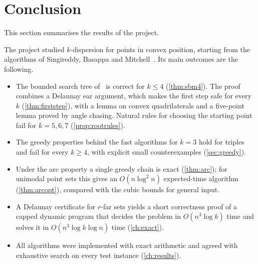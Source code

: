 \chapter{Conclusion}\label{ch:conclusion}

\begin{chapterabstract}
This section summarises the results of the project.
\end{chapterabstract}

The project studied $k$-dispersion for points in convex position, starting
from the algorithms of Singireddy, Basappa and Mitchell~\citep{sbm}. Its main
outcomes are the following.

\begin{itemize}[leftmargin=*,itemsep=2pt]
\item The bounded search tree of~\citet{sbm} is correct for $k\le4$
(\cref{thm:sbm4}). The proof combines a Delaunay ear argument, which makes the
first step safe for every $k$ (\cref{thm:firststep}), with a lemma on convex
quadrilaterals and a five-point lemma proved by angle chasing. Natural rules
for choosing the starting point fail for $k=5,6,7$ (\cref{prop:rootrules}).
\item The greedy properties behind the fast algorithms for $k=3$ hold for
triples and fail for every $k\ge4$, with explicit small counterexamples
(\cref{sec:greedy}).
\item Under the arc property a single greedy chain is exact
(\cref{thm:arc}); for unimodal point sets this gives an
$O(n\log^2n)$ expected-time algorithm (\cref{thm:arcopt}), compared with the
cubic bounds for general input.
\item A Delaunay certificate for $r$-far sets yields a short correctness proof of
a capped dynamic program that decides the problem in $O(n^3\log k)$ time and
solves it in $O(n^3\log k\log n)$ time (\cref{ch:exact}).
\item All algorithms were implemented with exact arithmetic and agreed with
exhaustive search on every test instance (\cref{ch:results}).
\end{itemize}
